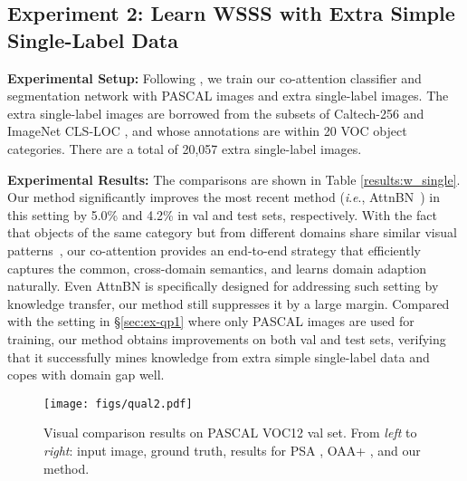 \documentclass[runningheads]{llncs}
\newcommand{\ie}{\textit{i}.\textit{e}.}
\begin{document}
\vspace{-5pt}
\subsection{\!Experiment 2: Learn WSSS with Extra Simple Single-Label Data} \label{sec:ex-qp2}
 \vspace{-3pt}
\noindent\textbf{Experimental Setup:} Following \cite{pinheiro2015image,li2019attention}, we train our co-attention classifier and segmentation network with PASCAL images and extra single-label images. The extra single-label images are borrowed from the subsets of Caltech-256 \cite{griffin2007caltech} and ImageNet CLS-LOC \cite{russakovsky2015imagenet}, and whose annotations are within 20 VOC object categories. There are a total of 20,057 extra single-label images.



\noindent\textbf{Experimental Results:} The comparisons are shown in Table \ref{results:w_single}. Our method significantly improves the most recent method (\ie, AttnBN~\cite{li2019attention}) in this setting by 5.0\% and 4.2\% in val and test sets, respectively. With the fact that objects of the same category but from different domains share similar visual patterns~\cite{li2019attention}, our co-attention provides an end-to-end strategy that  efficiently captures the common, cross-domain semantics, and learns domain adaption naturally. Even AttnBN is specifically designed for addressing such setting by knowledge transfer, our method still suppresses it by a large margin. Compared with the setting in \S\ref{sec:ex-qp1} where only PASCAL images are used for training, our method obtains improvements on both val and test sets, verifying that it successfully mines knowledge from extra simple single-label data and copes with domain gap well.


\begin{figure}[t]
\texttt{[image: figs/qual2.pdf]}\\  \vspace{-0.30 cm}\vspace*{-0.3cm}
\captionsetup{font=small}
			\caption{\small{Visual comparison results on PASCAL VOC12 val set. From \textit{left} to \textit{right}: input image, ground truth, results for PSA \cite{psa2018}, OAA+ \cite{oaa2019}, and our method.}}
			\label{fig:qual}
			 \vspace*{-0.5cm}
\end{figure}
\end{document}
